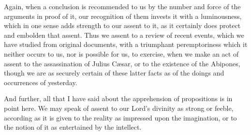 Again, when a conclusion is recommended to us by the number and
force of the arguments in proof of it, our recognition of them invests
it with a luminousness, which in one sense adds strength to our assent
to it, as it certainly does protect and embolden that assent. Thus we
assent to a review of recent events, which we have studied from
original documents, with a triumphant peremptoriness which it neither
occurs to us, nor is possible for us, to exercise, when we make an act
of assent to the assassination of Julius Cæsar, or to the existence
of the Abipones, though we are as securely certain of these latter
facts as of the doings and occurrences of yesterday.

And further, all that I have said about the apprehension of
propositions is in point here. We may speak of assent to our Lord's
divinity as strong or feeble, according as it is given to the reality
as impressed upon the imagination, or to the notion of it as
entertained by the intellect.

